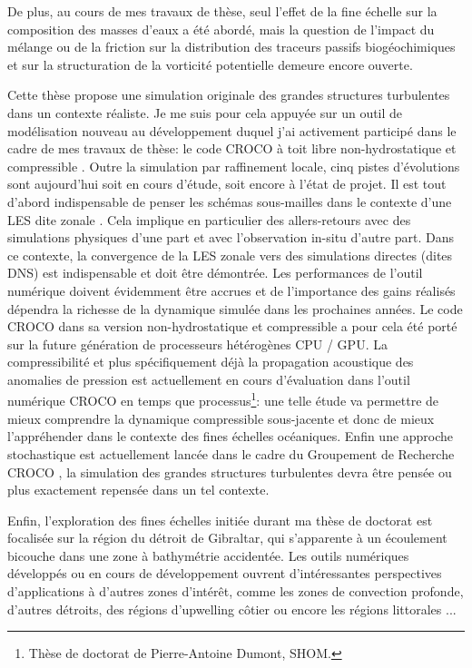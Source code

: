 De plus, au cours de mes travaux de thèse, seul l'effet de la fine échelle sur la composition des masses d'eaux a été abordé, mais la question de l'impact du mélange ou de la friction sur la distribution des traceurs passifs biogéochimiques \citep{penney_2020} et sur la structuration de la vorticité potentielle \citep{morel_potential_2019} demeure encore ouverte.

Cette thèse propose une simulation originale des grandes structures turbulentes dans un contexte réaliste. Je me suis pour cela appuyée sur un outil de modélisation nouveau au développement duquel j'ai activement participé dans le cadre de mes travaux de thèse: le code CROCO à toit libre non-hydrostatique et compressible \citep{hilt_2020}. Outre la simulation par raffinement locale, cinq pistes d'évolutions sont aujourd'hui soit en cours d'étude, soit encore à l'état de projet. Il est tout d'abord indispensable de penser les schémas sous-mailles dans le contexte d'une LES dite zonale \cite{friess_modelisation_2010}. Cela implique en particulier des allers-retours avec des simulations physiques d'une part et avec l'observation in-situ d'autre part. Dans ce contexte, la convergence de la LES zonale vers des simulations directes (dites DNS) est indispensable et doit être démontrée. Les performances de l'outil numérique doivent évidemment être accrues et de l'importance des gains réalisés dépendra la richesse de la dynamique simulée dans les prochaines années. Le code CROCO dans sa version non-hydrostatique et compressible a pour cela été porté sur la future génération de processeurs hétérogènes CPU / GPU. La compressibilité et plus spécifiquement déjà la propagation acoustique des anomalies de pression est actuellement en cours d'évaluation dans l'outil numérique CROCO en temps que processus\footnote{Thèse de doctorat de Pierre-Antoine Dumont, SHOM.}: une telle étude va permettre de mieux comprendre la dynamique compressible sous-jacente et donc de mieux l'appréhender dans le contexte des fines échelles océaniques. Enfin une approche stochastique est actuellement lancée dans le cadre du Groupement de Recherche CROCO \citep{memin_fluid_2014}, la simulation des grandes structures turbulentes devra être pensée ou plus exactement repensée dans un tel contexte.

Enfin, l'exploration des fines échelles initiée durant ma thèse de doctorat est focalisée sur la région du détroit de Gibraltar, qui s'apparente à un écoulement bicouche dans une zone à bathymétrie accidentée. Les outils numériques développés ou en cours de développement ouvrent d'intéressantes perspectives d'applications à d'autres zones d'intérêt, comme les zones de convection profonde, d'autres détroits, des régions d'upwelling côtier ou encore les régions littorales \citep{marchesiello_tridimensional_2021}...